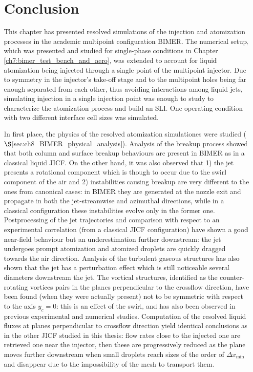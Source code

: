 \section{Conclusion}

This chapter has presented resolved simulations of the injection and atomization processes in the academic multipoint configuration BIMER. The numerical setup, which was presented and studied for single-phase conditions in Chapter \ref{ch7:bimer_test_bench_and_aero}, was extended to account for liquid atomization being injected through a single point of the multipoint injector. Due to symmetry in the injector's take-off stage and to the multipoint holes being far enough separated from each other, thus avoiding interactions among liquid jets, simulating injection in a single injection point was enough to study to characterize the atomization process and build an SLI. One operating condition with two different interface cell sizes was simulated. 

In first place, the physics of the resolved atomization simulationes were studied ($\S$\ref{sec:ch8_BIMER_physical_analysis}). Analysis of the breakup process showed that both column and surface breakup behaviours are present in BIMER as in a classical liquid JICF. On the other hand, it was also observed that 1) the jet presents a rotational component which is though to occur due to the swirl component of the air and 2) instabilities causing breakup are very different to the ones from canonical cases: in BIMER they are generated at the nozzle exit and propagate in both the jet-streamwise and azimuthal directions, while in a classical configuration these instabilities evolve only in the former one. Postprocessing of the jet trajectories and comparison with respect to an experimental correlation (from a classical JICF configuration) have shown a good near-field behaviour but an underestimation further downstream: the jet undergoes prompt atomization and atomized droplets are quickly dragged towards the air direction. Analysis of the turbulent gaseous structures has also shown that the jet has a perturbation effect which is still noticeable several diameters downstream the jet. The vortical structures, identified as the counter-rotating vortices pairs in the planes perpendicular to the crossflow direction, have been found (when they were actually present) not to be symmetric with respect to the axis $y_c = 0$: this is an effect of the swirl, and has also been observed in previous experimental and numerical studies. Computation of the resolved liquid fluxes at planes perpendicular to crossflow direction yield identical conclusions as in the other JICF studied in this thesis: flow rates close to the injected one are retrieved one near the injector, then these are progressively reduced as the plane moves further downstream when small droplets reach sizes of the order of  $\Delta x_\mathrm{min}$ and disappear due to the impossibility of the mesh to transport them.


